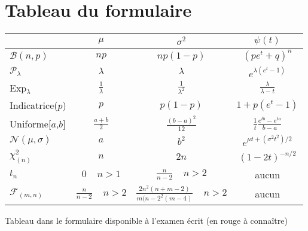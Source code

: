 \section{Tableau du formulaire}

\newcommand{\important}[1]{\textcolor[rgb]{1,0,0}{#1}} %

\begin{center}
\begin{tabular}{|l|c|c|c|}

    \hline
                              & $\mu$                           & $\sigma^2$                                      & $\psi(t)$ \\
    \hline
    $\mathcal{B}(n,p)$        & \important{$np$}                & \important{$np(1-p)$}                           & $(pe^t+q)^n$ \\
    \hline
    $\mathcal{P}_\lambda$     & \important{$\lambda$}           & \important{$\lambda$}                         & $e^{\lambda(e^t-1)}$ \\
    \hline
    Exp$_\lambda$             & \important{$\frac{1}{\lambda}$} & $\frac{1}{\lambda^2}$                           & $\frac{\lambda}{\lambda-t}$ \\
    \hline
    Indicatrice($p$)          & \important{$p$}                 & \important{$p(1-p)$}                            & $1+p(e^t-1)$\\
    \hline
    Uniforme[$a$,$b$]         & \important{$\frac{a+b}{2}$}     & $\frac{(b-a)^2}{12}$                            & $\frac{1}{t}\frac{e^{tb}-e^{ta}}{b-a}$\\
    \hline
    $\mathcal{N}(\mu,\sigma)$ & \important{$a$}                 & \important{$b^2$}                               & $e^{\mu t+(\sigma^2t^2)/2}$\\
    \hline
    $\chi^2_{(n)}$            & \important{$n$}                 & $2n$                                            & $(1-2t)^{-n/2}$\\
    \hline
    $t_n$                     & \important{$0\ \ \ \ \ n>1$}    & $\frac{n}{n-2}\ \ \ \ \ n>2$                    & \important{aucun}\\
    \hline
    $\mathcal{F}_{(m,n)}$     & $\frac{n}{n-2}\ \ \ \ \ n>2$    & $\frac{2n^2(n+m-2)}{m(n-2^2(m-4)}\ \ \ \ \ n>2$ & \important{aucun}\\
    \hline

\end{tabular}

Tableau dans le formulaire disponible à l'examen écrit (\important{en rouge à connaître})
\end{center}


